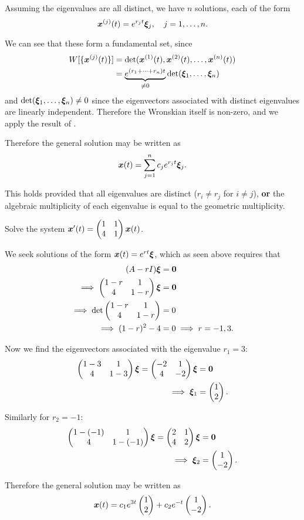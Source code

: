Assuming the eigenvalues are all distinct, we have $n$ solutions, each of the form
\[
\bm{x}^{(j)}(t) = e^{r_j t} \bm{\xi}_j, \quad j = 1, \ldots, n.
\]

We can see that these form a fundamental set, since
\begin{align*}
	W[\{\bm{x}^{(j)}(t)\}] &= \det(\bm{x}^{(1)}(t), \bm{x}^{(2)}(t), \ldots, \bm{x}^{(n)}(t)) \\
	&= \underbrace{e^{(r_1 + \cdots + r_n)t}}_{\neq 0} \det (\bm{\xi}_1, \ldots, \bm{\xi}_n)
\end{align*}
and $\det (\bm{\xi}_1, \ldots, \bm{\xi}_n) \neq 0$ since the eigenvectors associated with distinct eigenvalues are linearly independent. Therefore the Wronskian itself is non-zero, and we apply the result of .

Therefore the general solution may be written as
\begin{equation}\label{eq:generalsol}
	\bm{x}(t) = \sum_{j=1}^n c_j e^{r_jt} \bm{\xi}_j.
\end{equation}

This holds provided that all eigenvalues are distinct ($r_i \neq r_j$ for $i \neq j$), \textbf{or} the algebraic multiplicity of each eigenvalue is equal to the geometric multiplicity.

\begin{eg}\label{eg:constsys1}
	Solve the system $\bm{x}'(t) = \begin{pmatrix}1 & 1 \\ 4 & 1\end{pmatrix} \bm{x}(t)$.
	
	We seek solutions of the form $\bm{x}(t) = e^{rt} \bm{\xi}$, which as seen above requires that
	\begin{align*}
		(A-rI)\bm{\xi} &= \bm{0} \\
		\implies \begin{pmatrix}1-r & 1 \\ 4 & 1-r\end{pmatrix} \bm{\xi} &= \bm{0} \\
		\implies \det \begin{pmatrix}1-r & 1 \\ 4 & 1-r\end{pmatrix} &= 0 \\
		\implies (1-r)^2 -4 &= 0 \implies r = -1, 3.
	\end{align*}
	
	Now we find the eigenvectors associated with the eigenvalue $r_1=3$:
	\begin{align*}
		\begin{pmatrix}1-3 & 1 \\ 4 & 1-3\end{pmatrix} \bm{\xi} = \begin{pmatrix}-2 & 1 \\ 4 & -2\end{pmatrix} \bm{\xi} &= \bm{0} \\
		\implies \bm{\xi}_1 &= \begin{pmatrix}1 \\ 2\end{pmatrix}.
	\end{align*}
	
	Similarly for $r_2=-1$:
	\begin{align*}
		\begin{pmatrix}1-(-1) & 1 \\ 4 & 1-(-1)\end{pmatrix} \bm{\xi} = \begin{pmatrix}2 & 1 \\ 4 & 2\end{pmatrix} \bm{\xi} &= \bm{0} \\
		\implies \bm{\xi}_2 &= \begin{pmatrix}1 \\ -2\end{pmatrix}.
	\end{align*}
	
	Therefore the general solution may be written as
	\[
	\bm{x}(t) = c_1 e^{3t} \begin{pmatrix}1 \\ 2\end{pmatrix} + c_2 e^{-t} \begin{pmatrix}1 \\ -2\end{pmatrix}.
	\]
\end{eg}

